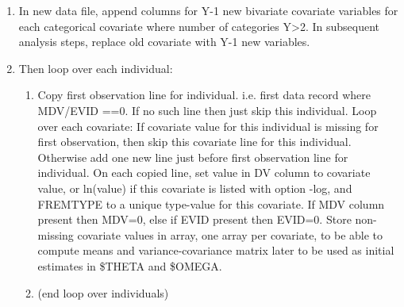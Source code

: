 \begin{enumerate}
    \item  In new data file, append columns for Y-1 new bivariate covariate variables for each
          categorical covariate where number of categories Y>2. In subsequent analysis steps, replace old covariate with
          Y-1 new variables.
\item Then loop over each individual:
\begin{enumerate}
	\item Copy first observation line for individual. i.e. first data record where MDV/EVID ==0. If no such line then just skip this individual.
Loop over each covariate:
If covariate value for this individual is missing for first observation, then skip this
covariate line for this individual. Otherwise add one %
new line %
just before first observation line for individual.
On each copied line, set value in DV column to covariate value, or ln(value) if this covariate is listed with option -log,
and FREMTYPE to a unique type-value for this covariate. %
If MDV column present then MDV=0, else if EVID present then EVID=0.%
Store non-missing covariate values in array, one array per covariate, to be able to compute means and %
variance-covariance matrix later to be used as initial estimates in \$THETA and \$OMEGA.
\item[] (end loop over individuals)
\end{enumerate}


\end{enumerate}
